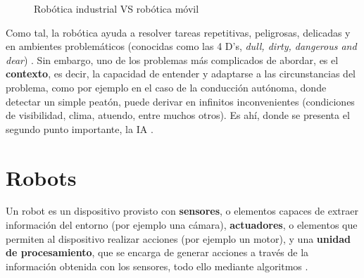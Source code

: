 \begin{figure} [h]
	\centering
	\quad
	\quad
	\caption{Robótica industrial VS robótica móvil}
	\label{fig:industrial_vs_mobile}
\end{figure}

Como tal, la robótica ayuda a resolver tareas repetitivas, peligrosas, delicadas y en ambientes problemáticos (conocidas como las 4 D's, \emph{dull, dirty, dangerous and dear}) \cite{4-d}. Sin embargo, uno de los problemas más complicados de abordar, es el \textbf{contexto}, es decir, la capacidad de entender y adaptarse a las circunstancias del problema, como por ejemplo en el caso de la conducción autónoma, donde detectar un simple peatón, puede derivar en infinitos inconvenientes (condiciones de visibilidad, clima, atuendo, entre muchos otros). Es ahí, donde se presenta el segundo punto importante, la \ac{IA} \cite{dworakowski2020robots}.\\

\section{Robots}
\label{sec:robots}

Un robot es un dispositivo provisto con \textbf{sensores}, o elementos capaces de extraer información del entorno (por ejemplo una cámara), \textbf{actuadores}, o elementos que permiten al dispositivo realizar acciones (por ejemplo un motor), y una \textbf{unidad de procesamiento}, que se encarga de generar acciones a través de la información obtenida con los sensores, todo ello mediante algoritmos \cite{Wang2022}.\\

